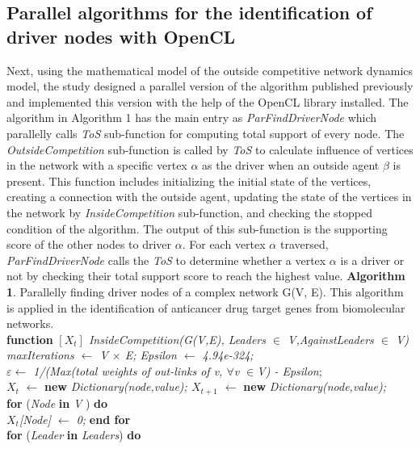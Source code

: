 \documentclass[5p,,preprint,12pt]{elsarticle}
\begin{document}
\subsection{Parallel algorithms for the identification of driver nodes with OpenCL}
Next, using the mathematical model of the outside competitive network dynamics model, the study designed a parallel version of the algorithm published previously and implemented this version with the help of the OpenCL library installed. 
The algorithm in Algorithm 1 has the main entry as \textit{ParFindDriverNode} which parallelly calls \textit{ToS} sub-function for computing total support of every node. The \textit{OutsideCompetition} sub-function is called by \textit{ToS} to calculate influence of vertices in the network with a specific vertex $\alpha$ as the driver when an outside agent $\beta$ is present. This function includes initializing the initial state of the vertices, creating a connection with the outside agent, updating the state of the vertices in the network by \textit{InsideCompetition} sub-function, and checking the stopped condition of the algorithm. The output of this sub-function is the supporting score of the other nodes to driver $\alpha$. For each vertex $\alpha$ traversed, \textit{ParFindDriverNode} calls the \textit{ToS} to determine whether a vertex $\alpha$ is a driver or not by checking their total support score to reach the highest value.
\textbf{Algorithm 1}. Parallelly finding driver nodes of a complex network G(V, E). This algorithm is applied in the identification of anticancer drug target genes from biomolecular networks. \\
\textbf{function} \textit{$[X_t]$ InsideCompetition(G(V,E), Leaders $\in$ V,AgainstLeaders $\in$ V)}  \\
\textit{maxIterations $\gets$ V $\times$ E; \textit{Epsilon} $\gets$  4.94e-324;}  \\
\textit{$\varepsilon \gets$ 1/(Max(total weights of out-links of v, $\forall$v $\in$V) - Epsilon}; \\
\textit{$X_t$} $\gets$ \textbf{new} \textit{Dictionary(node,value); $X_{t+1}$ $\gets$} \textbf{new} \textit{Dictionary(node,value);} \\
\textbf{for} (\textit{Node} \textbf{in} \textit{V} ) \textbf{do} \\
\hspace{0.5cm}   \textit{$X_t$[Node] $\gets$ 0;} \textbf{end for} \\
\textbf{for} (\textit{Leader} \textbf{in} \textit{Leaders}) \textbf{do} \\
\end{document}
